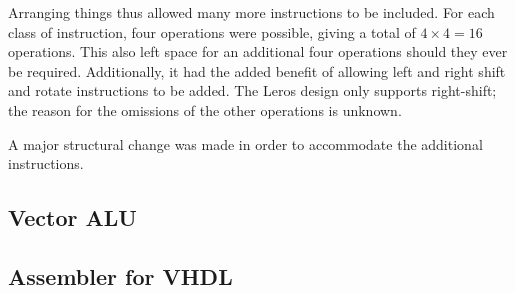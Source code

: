 Arranging things thus allowed many more instructions to be included. For each
class of instruction, four operations were possible, giving a total of
$4 \times 4 = 16$ operations. This also left space for an additional four
operations should they ever be required. Additionally, it  had the added
benefit of allowing left and
right shift and rotate instructions to be added. The Leros design only supports
right-shift; the reason for the omissions of the other operations is unknown.

A major structural change was made in order to accommodate the additional
instructions. 

\subsection{Vector ALU}
\subsection{Assembler for VHDL}

